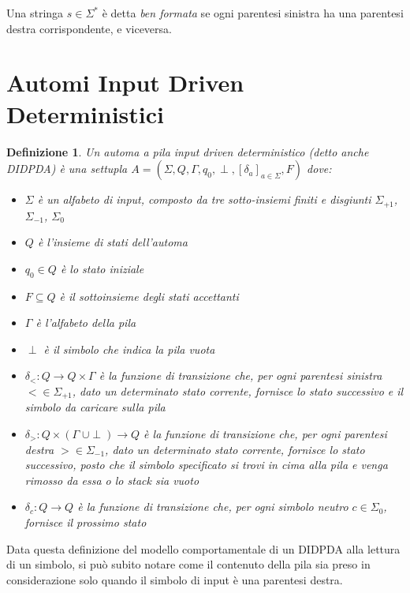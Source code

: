 \documentclass[a4paper,12pt]{report}
\newtheorem{definition}{Definizione}[chapter]
\theoremstyle{propositionstyle}
\begin{document}
    Una stringa $s \in \Sigma^*$ è detta \textit{ben formata} se ogni parentesi sinistra ha una parentesi destra corrispondente, e viceversa.


    \section{Automi Input Driven Deterministici}

    \begin{definition}
        \label{def:didpda}
        Un \textit{automa a pila input driven deterministico} (detto anche DIDPDA) è una settupla $A = \left(\Sigma, Q, \Gamma, q_0, \perp, \left[ \delta_a \right]_{a \in \Sigma}, F\right)$ dove:
        \begin{itemize}
            \item $\Sigma$ è un alfabeto di input, composto da tre sotto-insiemi finiti e disgiunti $\Sigma_{+1}$, $\Sigma_{-1}$, $\Sigma_{0}$
            \item $Q$ è l'insieme di stati dell'automa
            \item $q_{0} \in Q$ è lo stato iniziale
            \item $F \subseteq Q$ è il sottoinsieme degli stati \textit{accettanti}
            \item $\Gamma$ è l'\textit{alfabeto della pila}
            \item $\perp$ è il simbolo che indica la pila vuota
            \item $\delta_{<} : Q \rightarrow Q \times \Gamma$ è la funzione di transizione che, per ogni parentesi sinistra $< \in \Sigma_{+1}$, dato un determinato stato corrente, fornisce lo stato successivo e il simbolo da caricare sulla pila
            \item $\delta_{>} : Q \times \left(\Gamma\;\cup\perp\right) \rightarrow Q$ è la funzione di transizione che, per ogni parentesi destra $> \in \Sigma_{-1}$, dato un determinato stato corrente, fornisce lo stato successivo, posto che il simbolo specificato si trovi in cima alla pila e venga rimosso da essa o lo stack sia vuoto
            \item $\delta_{c} : Q \rightarrow Q$ è la funzione di transizione che, per ogni simbolo neutro $c \in \Sigma_{0}$, fornisce il prossimo stato
        \end{itemize}
    \end{definition}

    Data questa definizione del modello comportamentale di un DIDPDA alla lettura di un simbolo, si può subito notare come il contenuto della pila
    sia preso in considerazione solo quando il simbolo di input è una parentesi destra.
\end{document}
